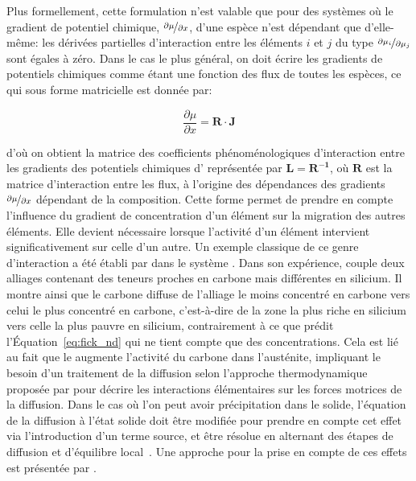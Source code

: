 Plus formellement, cette formulation n'est valable que pour des systèmes où le gradient de potentiel chimique, $\nicefrac{\partial\mu}{\partial{}x}$, d'une espèce n'est dépendant que d'elle-même: les dérivées partielles d'interaction entre les éléments $i$ et $j$ du type $\nicefrac{\partial\mu_{i}}{\partial\mu_{j}}$ sont égales à zéro. Dans le cas le plus général, on doit écrire les gradients de potentiels chimiques comme étant une fonction des flux de toutes les espèces, ce qui sous forme matricielle est donnée par:

\begin{equation}
  \frac{\partial\mu}{\partial x}=\mathbf{R}\cdot\mathbf{J}
  \label{eq:potentiel_generalise}
\end{equation}

\noindent d'où on obtient la matrice des coefficients phénoménologiques d'interaction entre les gradients des potentiels chimiques d'\citet{Onsager1931,Onsager1931ii} représentée par $\mathbf{L=R^{-1}}$, où $\mathbf{R}$ est la matrice d'interaction entre les flux, à l'origine des dépendances des gradients $\nicefrac{\partial\mu}{\partial{}x}$ dépendant de la composition. Cette forme permet de prendre en compte l'influence du gradient de concentration d'un élément sur la migration des autres éléments. Elle devient nécessaire lorsque l'activité d'un élément intervient significativement sur celle d'un autre. Un exemple classique de ce genre d'interaction a été établi par \citet{Darken1949} dans le système . Dans son expérience, \citet{Darken1949} couple deux alliages contenant des teneurs proches en carbone mais différentes en silicium. Il montre ainsi que le carbone diffuse de l'alliage le moins concentré en carbone vers celui le plus concentré en carbone, c'est-à-dire de la zone la plus riche en silicium vers celle la plus pauvre en silicium, contrairement à ce que prédit l'Équation~\ref{eq:fick_nd} qui ne tient compte que des concentrations. Cela est lié au fait que le  augmente l'activité du carbone dans l'austénite, impliquant le besoin d'un traitement de la diffusion selon l'approche thermodynamique proposée par \citet{Onsager1931,Onsager1931ii} pour décrire les interactions élémentaires sur les forces motrices de la diffusion. Dans le cas où l'on peut avoir précipitation dans le solide, l'équation de la diffusion à l'état solide doit être modifiée pour prendre en compte cet effet via l'introduction d'un terme source, et être résolue en alternant des étapes de diffusion et d'équilibre local~\cite{Borgenstam2000}. Une approche pour la prise en compte de ces effets est présentée par \citet{Goune2000543}.

